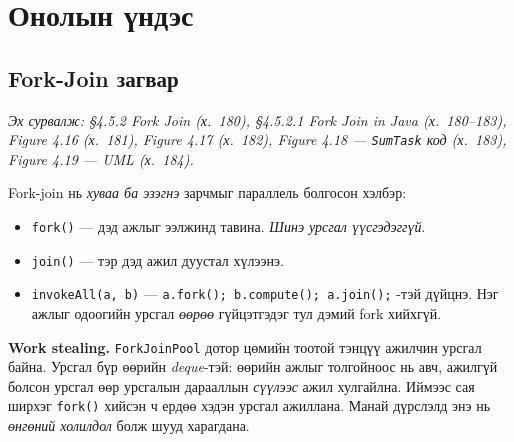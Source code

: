 \documentclass[11pt,a4paper]{article}
\begin{document}
\section{Онолын үндэс}

\subsection{Fork-Join загвар}
\emph{Эх сурвалж: \S4.5.2 Fork Join (х.~180), \S4.5.2.1 Fork Join in Java
(х.~180--183), Figure 4.16 (х.~181), Figure 4.17 (х.~182),
Figure 4.18 --- \texttt{SumTask} код (х.~183), Figure 4.19 --- UML (х.~184).}

Fork-join нь \emph{хуваа ба эзэгнэ} зарчмыг параллель болгосон хэлбэр:

\begin{center}
\end{center}

\begin{itemize}[nosep,leftmargin=*]
  \item \texttt{fork()} --- дэд ажлыг ээлжинд тавина. \emph{Шинэ урсгал
        үүсгэдэггүй}.
  \item \texttt{join()} --- тэр дэд ажил дуустал хүлээнэ.
  \item \texttt{invokeAll(a, b)} --- \texttt{a.fork(); b.compute(); a.join();}
        -тэй дүйцнэ. Нэг ажлыг одоогийн урсгал \emph{өөрөө} гүйцэтгэдэг тул
        дэмий fork хийхгүй.
\end{itemize}

\textbf{Work stealing.} \texttt{ForkJoinPool} дотор цөмийн тоотой тэнцүү
ажилчин урсгал байна. Урсгал бүр өөрийн \emph{deque}-тэй: өөрийн ажлыг
толгойноос нь авч, ажилгүй болсон урсгал өөр урсгалын дарааллын \emph{сүүлээс}
ажил хулгайлна. Иймээс сая ширхэг \texttt{fork()} хийсэн ч ердөө хэдэн урсгал
ажиллана. Манай дүрслэлд энэ нь \emph{өнгөний холилдол} болж шууд харагдана.
\end{document}

